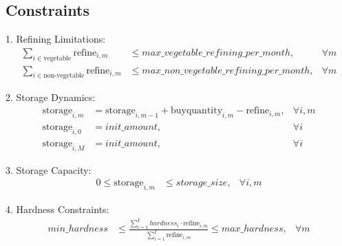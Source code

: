 \documentclass{article}
\begin{document}
\subsection*{Constraints}
1. Refining Limitations:
\begin{align*}
\sum_{i \in \text{vegetable}} \text{refine}_{i,m} & \leq max\_vegetable\_refining\_per\_month, & \forall m \\
\sum_{i \in \text{non-vegetable}} \text{refine}_{i,m} & \leq max\_non\_vegetable\_refining\_per\_month, & \forall m 
\end{align*}

2. Storage Dynamics:
\begin{align*}
\text{storage}_{i,m} & = \text{storage}_{i,m-1} + \text{buyquantity}_{i,m} - \text{refine}_{i,m}, & \forall i, m \\
\text{storage}_{i,0} & = init\_amount, & \forall i \\
\text{storage}_{i,M} & = init\_amount, & \forall i
\end{align*}

3. Storage Capacity:
\begin{align*}
0 \leq \text{storage}_{i,m} & \leq storage\_size, & \forall i, m
\end{align*}

4. Hardness Constraints:
\begin{align*}
min\_hardness & \leq \frac{\sum_{i=1}^{I} hardness_i \cdot \text{refine}_{i,m}}{\sum_{i=1}^{I} \text{refine}_{i,m}} \leq max\_hardness, & \forall m
\end{align*}
\end{document}
